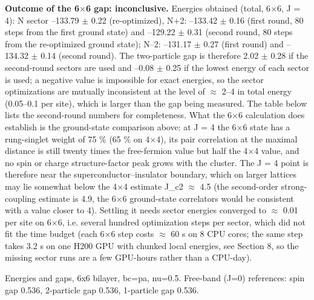 \documentclass[10pt]{article}
\begin{document}
\textbf{Outcome of the 6$\times$6 gap: inconclusive.} Energies obtained (total, 6$\times$6, J = 4): N sector --133.79 $\pm$ 0.22 (re-optimized), N+2: --133.42 $\pm$ 0.16 (first round, 80 steps from the first ground state) and --129.22 $\pm$ 0.31 (second round, 80 steps from the re-optimized ground state); N--2: --131.17 $\pm$ 0.27 (first round) and --134.32 $\pm$ 0.14 (second round). The two-particle gap is therefore 2.02 $\pm$ 0.28 if the second-round sectors are used and --0.08 $\pm$ 0.25 if the lowest energy of each sector is used; a negative value is impossible for exact energies, so the sector optimizations are mutually inconsistent at the level of $\approx$ 2--4 in total energy (0.05--0.1 per site), which is larger than the gap being measured. The table below lists the second-round numbers for completeness. What the 6$\times$6 calculation does establish is the ground-state comparison above: at J = 4 the 6$\times$6 state has a rung-singlet weight of 75 \% (65 \% on 4$\times$4), its pair correlation at the maximal distance is still twenty times the free-fermion value but half the 4$\times$4 value, and no spin or charge structure-factor peak grows with the cluster. The J = 4 point is therefore near the superconductor--insulator boundary, which on larger lattices may lie somewhat below the 4$\times$4 estimate J\_c2 $\approx$ 4.5 (the second-order strong-coupling estimate is 4.9, the 6$\times$6 ground-state correlators would be consistent with a value closer to 4). Settling it needs sector energies converged to $\approx$ 0.01 per site on 6$\times$6, i.e. several hundred optimization steps per sector, which did not fit the time budget (each 6$\times$6 step costs $\approx$ 60 s on 8 CPU cores; the same step takes 3.2 s on one H200 GPU with chunked local energies, see Section 8, so the missing sector runs are a few GPU-hours rather than a CPU-day).

Energies and gaps, 6x6 bilayer, bc=pa, nu=0.5. Free-band (J=0) references: spin gap 0.536, 2-particle gap 0.536, 1-particle gap 0.536.

\begin{center}\footnotesize\setlength{\tabcolsep}{3pt}
\end{center}
\end{document}
